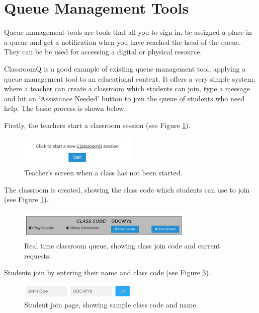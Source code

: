 \newpage
\section{Queue Management Tools}

Queue management tools are tools that all you to sign-in, be assigned a place in a queue and get a notification when you have reached the head of the queue. They can be be used for accessing a digital or physical resource.

ClassroomQ is a good example of existing queue management tool, applying a queue management tool to an educational context. It offers a very simple system, where a teacher can create a classroom which students can join, type a message and hit an `Assistance Needed' button to join the queue of students who need help. The basic process is shown below.

Firstly, the teachers start a classroom session (see Figure \ref{fig:cqstart}).

\FloatBarrier
\begin{figure}[H]
  \centering
  \includegraphics[width=0.5\textwidth]{2context/images/cq1.png}
  \caption{Teacher's screen when a class has not been started.}
  \label{fig:cqstart}
\end{figure}

The classroom is created, showing the class code which students can use to join (see Figure \ref{fig:cqstart}).

\FloatBarrier
\begin{figure}[H]
  \centering
  \includegraphics[width=0.75\textwidth]{2context/images/cq2.png}
  \caption{Real time classroom queue, showing class join code and current requests.}
  \label{fig:cqcode}
\end{figure}

Students join by entering their name and class code (see Figure \ref{fig:cqjoin}).

\FloatBarrier
\begin{figure}[H]
  \centering
  \includegraphics[width=0.5\textwidth]{2context/images/cq3.png}
  \caption{Student join page, showing sample class code and name.}
  \label{fig:cqjoin}
\end{figure}

